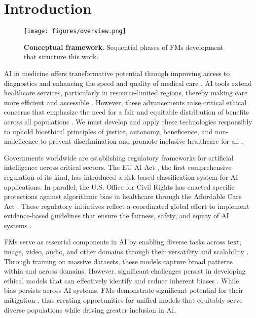 \section{Introduction}
\begin{figure*}[htb]
    \centering
    \texttt{[image: figures/overview.png]}
    \caption{\textbf{Conceptual framework}. Sequential phases of FMs development that structure this work.}
    \label{fig:overview}
\end{figure*}
AI in medicine offers transformative potential through improving access to diagnostics and enhancing the speed and quality of medical care \cite{moor_foundation_2023, zhang_challenges_2023}. AI tools extend healthcare services, particularly in resource-limited regions, thereby making care more efficient and accessible \cite{widner_lessons_2023}. However, these advancements raise critical ethical concerns that emphasize the need for a fair and equitable distribution of benefits across all populations \cite{rajkomar_ensuring_2018, ricci_lara_addressing_2022, mccradden_ethical_2020}. We must develop and apply these technologies responsibly to uphold bioethical principles of justice, autonomy, beneficence, and non-maleficence to prevent discrimination and promote inclusive healthcare for all \cite{beauchamp_principles_1994}.

Governments worldwide are establishing regulatory frameworks for artificial intelligence across critical sectors. The EU AI Act \cite{european_parliament_and_council_regulation_2024}, the first comprehensive regulation of its kind, has introduced a risk-based classification system for AI applications. In parallel, the U.S. Office for Civil Rights has enacted specific protections against algorithmic bias in healthcare through the Affordable Care Act \cite{united_states_national_archives_and_records_administration_office_of_the_federal_register_act_2010}. These regulatory initiatives reflect a coordinated global effort to implement evidence-based guidelines that ensure the fairness, safety, and equity of AI systems \cite{high-level_expert_group_on_artificial_intelligence_ethics_2019, longpre_responsible_2024, obermeyer_algorithmic_nodate, lekadir_future-ai_2025, vasey_reporting_2022, collins_tripodai_2024, tejani_checklist_2024, liu_reporting_2020}.

FMs serve as essential components in AI by enabling diverse tasks across text, image, video, audio, and other domains through their versatility and scalability \cite{bommasani_opportunities_2022}. Through training on massive datasets, these models capture broad patterns within and across domains. However, significant challenges persist in developing ethical models that can effectively identify and reduce inherent biases \cite{khan_how_2023, glocker_risk_2023, li_empirical_2024}. While bias persists across AI systems, FMs demonstrate significant potential for their mitigation \cite{vaidya_demographic_2024, queiroz_using_2025}, thus creating opportunities for unified models that equitably serve diverse populations while driving greater inclusion in AI.

